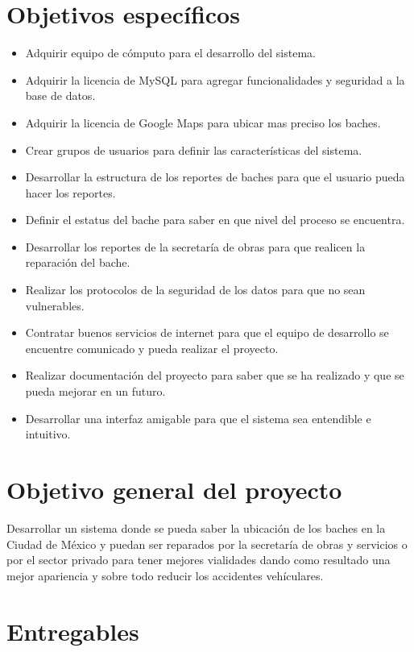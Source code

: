 \documentclass[12pt,twoside, a4paper]{article}
\begin{document}
\section{Objetivos específicos}
\begin{itemize}
    \item Adquirir equipo de cómputo para el desarrollo del sistema.
    \item Adquirir la licencia de MySQL para agregar funcionalidades y seguridad
        a la base de datos.
    \item Adquirir la licencia de Google Maps para ubicar mas preciso los baches.
    \item Crear grupos de usuarios para definir las características del sistema.
    \item Desarrollar la estructura de los reportes de baches para que el usuario 
        pueda hacer los reportes.
    \item Definir el estatus del bache para saber en que nivel del proceso se encuentra.
    \item Desarrollar los reportes de la secretaría de obras para que realicen la 
        reparación del bache.
    \item Realizar los protocolos de la seguridad de los datos para que no sean
        vulnerables.
    \item Contratar buenos servicios de internet para que el equipo de desarrollo 
        se encuentre comunicado y pueda realizar el proyecto.
    \item Realizar documentación del proyecto para saber que se ha realizado y que
        se pueda mejorar en un futuro.
    \item Desarrollar una interfaz amigable para que el sistema sea entendible e 
        intuitivo.
\end{itemize}

\section{Objetivo general del proyecto}

Desarrollar un sistema donde se pueda saber la ubicación de los baches en la Ciudad de México
y puedan ser reparados por la secretaría de obras y servicios o por el sector privado
para tener mejores vialidades dando como resultado una mejor apariencia y sobre todo
reducir los accidentes vehículares.
\newpage
\section{Entregables}
\end{document}
